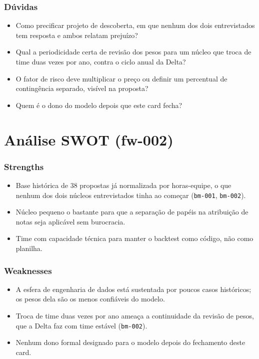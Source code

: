 \subsubsection{Dúvidas}

\begin{itemize}
  \item Como precificar projeto de descoberta, em que nenhum dos dois entrevistados tem resposta e ambos relatam prejuízo?
  \item Qual a periodicidade certa de revisão dos pesos para um núcleo que troca de time duas vezes por ano, contra o ciclo anual da Delta?
  \item O fator de risco deve multiplicar o preço ou definir um percentual de contingência separado, visível na proposta?
  \item Quem é o dono do modelo depois que este card fecha?
\end{itemize}


\clearpage
\section{Análise SWOT (fw-002)}



\subsubsection{Strengths}

\begin{itemize}
  \item Base histórica de 38 propostas já normalizada por horas-equipe, o que nenhum dos dois núcleos entrevistados tinha ao começar (\texttt{bm-001}, \texttt{bm-002}).
  \item Núcleo pequeno o bastante para que a separação de papéis na atribuição de notas seja aplicável sem burocracia.
  \item Time com capacidade técnica para manter o backtest como código, não como planilha.
\end{itemize}

\subsubsection{Weaknesses}

\begin{itemize}
  \item A esfera de engenharia de dados está sustentada por poucos casos históricos; os pesos dela são os menos confiáveis do modelo.
  \item Troca de time duas vezes por ano ameaça a continuidade da revisão de pesos, que a Delta faz com time estável (\texttt{bm-002}).
  \item Nenhum dono formal designado para o modelo depois do fechamento deste card.
\end{itemize}

